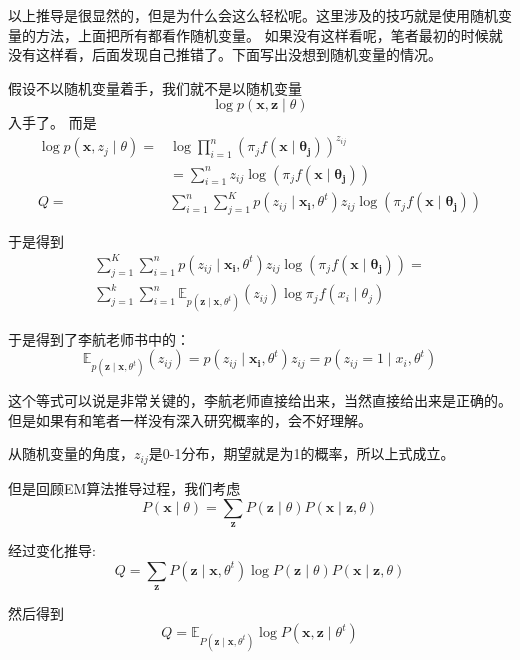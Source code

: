 \documentclass{article}
\begin{document}
        以上推导是很显然的，但是为什么会这么轻松呢。这里涉及的技巧就是使用随机变量的方法，上面把所有都看作随机变量。
        如果没有这样看呢，笔者最初的时候就没有这样看，后面发现自己推错了。下面写出没想到随机变量的情况。

        假设不以随机变量着手，我们就不是以随机变量\[\log p(\boldsymbol{x},\boldsymbol{z}\mid\theta)\]入手了。
        而是
        \begin{align*}
            \log p(\boldsymbol{x},z_j\mid\theta)=&\log\prod_{i=1}^{n}(\pi_jf(\boldsymbol{x\mid\theta_j}))^{z_{ij}}\\
                &=\sum_{i=1}^{n}z_{ij}\log(\pi_jf(\boldsymbol{x\mid\theta_j}))
                \\
                Q=&\sum_{i=1}^{n}\sum_{j=1}^{K}p(z_{ij}\mid\boldsymbol{x_i},\theta^t)z_{ij}\log(\pi_jf(\boldsymbol{x\mid\theta_j}))
        \end{align*}

        于是得到
        \begin{align*}
            \sum_{j=1}^{K}\sum_{i=1}^{n}p(z_{ij}\mid\boldsymbol{x_i},\theta^t)z_{ij}\log(\pi_jf(\boldsymbol{x\mid\theta_j}))=\\\sum_{j=1}^{k}\sum_{i=1}^{n}\mathbb{E}_{p(\boldsymbol{z}\mid\boldsymbol{x},\theta^t)}(z_{ij})\log\pi_jf(x_i\mid\theta_j)    
        \end{align*}
        
        于是得到了李航老师书中的：
        \[\mathbb{E}_{p(\boldsymbol{z}\mid\boldsymbol{x},\theta^t)}(z_{ij})=p(z_{ij}\mid\boldsymbol{x_i},\theta^t)z_{ij}=p(z_{ij}=1\mid x_i,\theta^t)\]

        这个等式可以说是非常关键的，李航老师直接给出来，当然直接给出来是正确的。但是如果有和笔者一样没有深入研究概率的，会不好理解。
        
        从随机变量的角度，$z_{ij}$是0-1分布，期望就是为1的概率，所以上式成立。

        但是回顾EM算法推导过程，我们考虑
        \[P(\boldsymbol{x}\mid \theta)=\sum_{\boldsymbol{z}}P(\boldsymbol{z}\mid \theta)P(\boldsymbol{x}\mid\boldsymbol{z},\theta)\]

        经过变化推导:
        \[Q= \sum_{\boldsymbol{z}}P(\boldsymbol{z}\mid\boldsymbol{x},\theta^t)\log P(\boldsymbol{z}\mid \theta)P(\boldsymbol{x}\mid\boldsymbol{z},\theta)\]

        然后得到
        \[Q=\mathbb{E}_{P(\boldsymbol{z}\mid\boldsymbol{x},\theta^t)}\log P(\boldsymbol{x},\boldsymbol{z}\mid \theta^t)\]
\end{document}
